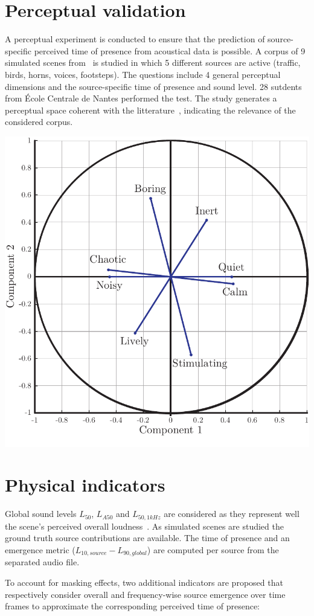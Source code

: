 \documentclass[a0,portrait]{a0poster}
\begin{document}
\begin{multicols}{2}
\section*{Perceptual validation}

A perceptual experiment is conducted to ensure that the prediction of source-specific perceived time of presence from acoustical data is possible. A corpus of 9 simulated scenes from~\cite{gloaguen2017} is studied in which 5 different sources are active (traffic, birds, horns, voices, footsteps). The questions include 4 general perceptual dimensions and the source-specific time of presence and sound level. 28 sutdents from \'Ecole Centrale de Nantes performed the test. The study generates a perceptual space coherent with the litterature~\cite{axelsson2010}, indicating the relevance of the considered corpus.

\begin{center}\vspace{1cm}
\includegraphics[width=0.5\linewidth]{pca.pdf}
\end{center}\vspace{1cm}

\section*{Physical indicators}


Global sound levels $L_{50}$, $L_{A50}$ and $L_{50, 1kHz}$ are considered as they represent well the scene's perceived overall loudness~\cite{aumond2017}. As simulated scenes are studied the ground truth source contributions are available. The time of presence and an emergence metric ($L_{10, source}-L_{90, global}$) are computed per source from the separated audio file.

To account for masking effects, two additional indicators are proposed that respectively consider overall and frequency-wise source emergence over time frames to approximate the corresponding perceived time of presence:


\end{multicols}
\end{document}
